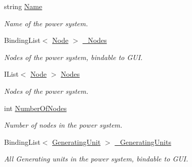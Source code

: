 \begin{DoxyCompactItemize}
\item 
string \hyperlink{class_power_system_planning_1_1_power_system_ae511d3a9d7c871726037041b9fdabe14}{Name}
\begin{DoxyCompactList}\small\item\em Name of the power system. \end{DoxyCompactList}\item 
Binding\+List$<$ \hyperlink{class_power_system_planning_1_1_node}{Node} $>$ \hyperlink{class_power_system_planning_1_1_power_system_afe8041cf92b81053ffc54c1ab2cd76cc}{\+\_\+\+Nodes}
\begin{DoxyCompactList}\small\item\em Nodes of the power system, bindable to G\+UI. \end{DoxyCompactList}\item 
I\+List$<$ \hyperlink{class_power_system_planning_1_1_node}{Node} $>$ \hyperlink{class_power_system_planning_1_1_power_system_aa51d9c68a12cae03acd530e9ceff58f9}{Nodes}
\begin{DoxyCompactList}\small\item\em Nodes of the power system. \end{DoxyCompactList}\item 
int \hyperlink{class_power_system_planning_1_1_power_system_a3d7abefe87bb1621c5d61644b83ae3d5}{Number\+Of\+Nodes}
\begin{DoxyCompactList}\small\item\em Number of nodes in the power system. \end{DoxyCompactList}\item 
Binding\+List$<$ \hyperlink{class_power_system_planning_1_1_generating_unit}{Generating\+Unit} $>$ \hyperlink{class_power_system_planning_1_1_power_system_af58aafa6a09ec68a492ea650e587ee36}{\+\_\+\+Generating\+Units}
\begin{DoxyCompactList}\small\item\em All Generating units in the power system, bindable to G\+UI. \end{DoxyCompactList}\item 

\end{DoxyCompactItemize}
